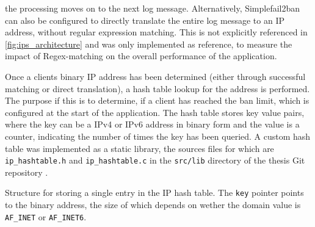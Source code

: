 the processing moves on to the next log message. Alternatively, Simplefail2ban can also be configured to directly translate the entire log message to an \ac{IP} address, without regular expression matching.
This is not explicitly referenced in \ref{fig:ips_architecture} and was only implemented as reference, to measure the impact of \ac{Regex}-matching on the overall performance of the application.
\par
Once a clients binary \ac{IP} address has been determined (either through successful matching or direct translation), a hash table lookup for the address is performed.
The purpose if this is to determine, if a client has reached the ban limit, which is configured at the start of the application. 
The hash table stores key value pairs, where the key can be a \ac{IPv4} or \ac{IPv6} address in binary form and the value is a counter,
indicating the number of times the key has been queried. A custom hash table was implemented as a static library, the sources files for which are \texttt{ip\_hashtable.h}
and \texttt{ip\_hashtable.c} in the \texttt{src/lib} directory of the thesis Git repository \cite{gitlab}. 

\begin{algorithm}[h!]
    
    \label{alg:ip_hashtable}
    \caption[IP Hash Table]{Structure for storing a single entry in the IP hash table. The \texttt{key} pointer 
    points to the binary address, the size of which depends on wether the domain value is \texttt{AF\_INET} or \texttt{AF\_INET6}.}
\end{algorithm}


